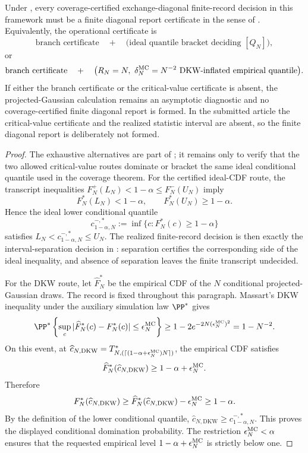 \begin{proposition}\label{prop:finite-diagonal-report-master-main}
Under , every coverage-certified
exchange-diagonal finite-record decision in this framework must be a finite
diagonal report certificate in the sense of
.  Equivalently, the operational
certificate is
\[
\text{branch certificate}
\quad+\quad
\bigl(\text{ideal quantile bracket deciding }[Q_N]\bigr),
\]
or
\[
\text{branch certificate}
\quad+\quad
\bigl(R_N=N,\ \delta_N^{\rm MC}=N^{-2}\text{ DKW-inflated empirical quantile}\bigr).
\]
If either the branch certificate or the critical-value certificate is absent,
the projected-Gaussian calculation remains an asymptotic diagnostic and no
coverage-certified finite diagonal report is formed.
In the submitted article the critical-value certificate and the realized
statistic interval are absent, so the finite diagonal report is deliberately
not formed.
\end{proposition}

\begin{proof}
The exhaustive alternatives are part of
; it remains only to verify that the two
allowed critical-value routes dominate or bracket the same ideal conditional
quantile used in the coverage theorem.
For the certified ideal-CDF route, the transcript inequalities
\(F_N^+(L_N)<1-\alpha\le F_N^-(U_N)\) imply
\[
F_N^\ast(L_N)<1-\alpha,\qquad F_N^\ast(U_N)\ge1-\alpha.
\]
Hence the ideal lower conditional quantile
\[
c_{1-\alpha,N}^{-,*}:=\inf\{c:F_N^\ast(c)\ge1-\alpha\}
\]
satisfies \(L_N<c_{1-\alpha,N}^{-,*}\le U_N\).  The realized finite-record
decision is then exactly the interval-separation decision in
: separation certifies the
corresponding side of the ideal inequality, and absence of separation leaves
the finite transcript undecided.

For the DKW route, let \(\widehat F_N^\ast\) be the empirical CDF of the \(N\)
conditional projected-Gaussian draws.  The record is fixed throughout this
paragraph.  Massart's DKW inequality under the auxiliary simulation law
\(\PP^\ast\) gives
\[
\PP^\ast\left\{\sup_c|\widehat F_N^\ast(c)-F_N^\ast(c)|
\le \epsilon_N^{\rm MC}\right\}
\ge
1-2e^{-2N(\epsilon_N^{\rm MC})^2}
=1-N^{-2}.
\]
On this event, at
\(\widehat c_{N,\mathrm{DKW}}
=T^*_{N,(\lceil(1-\alpha+\epsilon_N^{\rm MC})N\rceil)}\),
the empirical CDF satisfies
\[
\widehat F_N^\ast(\widehat c_{N,\mathrm{DKW}})
\ge1-\alpha+\epsilon_N^{\rm MC}.
\]
Therefore
\[
F_N^\ast(\widehat c_{N,\mathrm{DKW}})
\ge
\widehat F_N^\ast(\widehat c_{N,\mathrm{DKW}})
-\epsilon_N^{\rm MC}
\ge1-\alpha.
\]
By the definition of the lower conditional quantile,
\(\widehat c_{N,\mathrm{DKW}}\ge c_{1-\alpha,N}^{-,*}\).  This proves the
displayed conditional domination probability.  The restriction
\(\epsilon_N^{\rm MC}<\alpha\) ensures that the requested empirical level
\(1-\alpha+\epsilon_N^{\rm MC}\) is strictly below one.
\end{proof}


